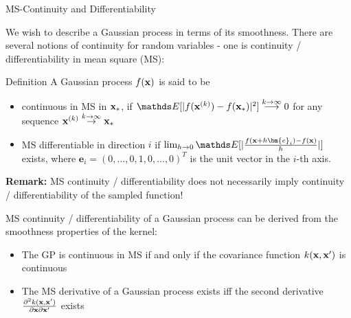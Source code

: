 








\begin{vbframe}{MS-Continuity and Differentiability}

We wish to describe a Gaussian process in terms of its smoothness. There are several notions of continuity for random variables - one is continuity / differentiability in mean square (MS): 

\begin{block}{Definition}
A Gaussian process $f(\mathbf{x})$ is said to be 
\begin{itemize}
\item continuous in MS in $\mathbf{x}_*$, if $\E[|f(\xv^{(k)}) - f(\xv_*)|^2] \overset{k \to \infty}{\longrightarrow} 0$ for any sequence $\mathbf{x}^{(k)} \overset{k \to \infty}{\to} \mathbf{x}_*$
\item MS differentiable in direction $i$ if $\lim_{h\to 0}\E[|\frac{f(\xv + h\bm{e}_i) - f(\xv)}{h}|]$ exists, where $\bm{e}_i = (0,\dots,0,1,0,\dots,0)^T$ is the unit vector in the $i$-th axis.
\end{itemize}
\end{block}

\textbf{Remark:} MS continuity / differentiability does not necessarily imply continuity / differentiability of the sampled function! 

\framebreak

MS continuity / differentiability of a Gaussian process can be derived from the smoothness properties of the kernel:

\begin{itemize}
\item The GP is continuous in MS if and only if the covariance function $k(\mathbf{x}, \mathbf{x}
^\prime)$ is continuous 
\item The MS derivative of a Gaussian process exists iff the second derivative $\frac{\partial^{2} k(\mathbf{x}, \mathbf{x}^\prime)}{\partial \mathbf{x}\partial \mathbf{x}^\prime}$ exists
\end{itemize}

\end{vbframe}



